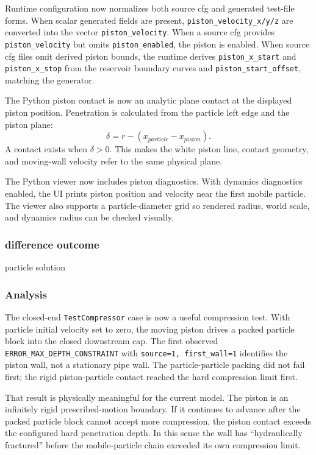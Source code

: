 Runtime configuration now normalizes both source cfg and generated test-file
forms.  When scalar generated fields are present,
\texttt{piston\_velocity\_x/y/z} are converted into the vector
\texttt{piston\_velocity}.  When a source cfg provides
\texttt{piston\_velocity} but omits \texttt{piston\_enabled}, the piston is
enabled.  When source cfg files omit derived piston bounds, the runtime derives
\texttt{piston\_x\_start} and \texttt{piston\_x\_stop} from the reservoir
boundary curves and \texttt{piston\_start\_offset}, matching the generator.

The Python piston contact is now an analytic plane contact at the displayed
piston position.  Penetration is calculated from the particle left edge and
the piston plane:
\[
    \delta = r - (x_{particle}-x_{piston}).
\]
A contact exists when \(\delta>0\).  This makes the white piston line,
contact geometry, and moving-wall velocity refer to the same physical plane.

The Python viewer now includes piston diagnostics.  With dynamics diagnostics
enabled, the UI prints piston position and velocity near the first mobile
particle.  The viewer also supports a particle-diameter grid so rendered
radius, world scale, and dynamics radius can be checked visually.

\subsubsection{difference outcome}

particle solution

\subsubsection{Analysis}

The closed-end \texttt{TestCompressor} case is now a useful compression test.
With particle initial velocity set to zero, the moving piston drives a packed
particle block into the closed downstream cap.  The first observed
\texttt{ERROR\_MAX\_DEPTH\_CONSTRAINT} with
\texttt{source=1, first\_wall=1} identifies the piston wall, not a stationary
pipe wall.  The particle-particle packing did not fail first; the rigid
piston-particle contact reached the hard compression limit first.

That result is physically meaningful for the current model.  The piston is an
infinitely rigid prescribed-motion boundary.  If it continues to advance after
the packed particle block cannot accept more compression, the piston contact
exceeds the configured hard penetration depth.  In this sense the wall has
``hydraulically fractured'' before the mobile-particle chain exceeded its own
compression limit.

